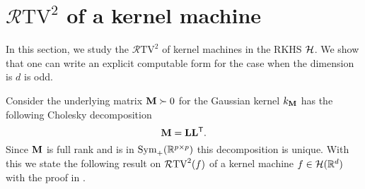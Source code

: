 \section{$\mathcal{R}\mathrm{TV}^2$ of a kernel machine}\label{sec: rnorm}
In this section, we study the $\mathcal{R}\mathrm{TV}^2$ of kernel machines in the RKHS ${\mathcal{H}}$. We show that one can write an explicit computable form for the case when the dimension is $d$ is odd. 

Consider the underlying matrix ${\mathbf{M}} \succ 0$ for the Gaussian kernel $k_{{\mathbf{M}}}$ has the following Cholesky decomposition 
$${\mathbf{M}} = {\mathbf{L}}{\mathbf{L}}^{\mathsf{T}}.$$
Since ${\mathbf{M}}$ is full rank and is in $\text{Sym}_{+}(\mathbb{R}^{p\times p})$ this decomposition is unique. With this we state the following result on $\mathcal{R}\mathrm{TV}^2({f})$ of a kernel machine $f \in {\mathcal{H}}(\mathbb{R}^d)$ with the proof in \iftoggle{longversion}{\appref{app: explicit}}{the supplemental materials}.


